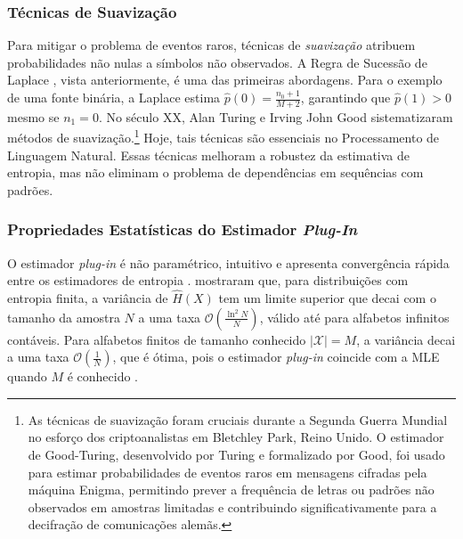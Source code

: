 \subsubsection{Técnicas de Suavização}

Para mitigar o problema de eventos raros, técnicas de \emph{suavização} atribuem
probabilidades não nulas a símbolos não observados. A Regra de Sucessão de
Laplace \parencite{laplace1840}, vista anteriormente, é uma das primeiras abordagens.
Para o exemplo de uma fonte binária, a Laplace estima
$\hat{p}(0) = \frac{n_0 + 1}{M + 2}$, garantindo que $\hat{p}(1) > 0$
mesmo se $n_1 = 0$. No século XX, Alan Turing e Irving John Good \parencite{good1953} 
sistematizaram métodos de suavização.\footnote[][-27ex]{As técnicas de suavização foram
cruciais durante a Segunda Guerra Mundial no esforço dos criptoanalistas em
Bletchley Park, Reino Unido. O estimador de Good-Turing, desenvolvido por
Turing e formalizado por Good, foi usado para estimar probabilidades de eventos
raros em mensagens cifradas pela máquina Enigma, permitindo prever a frequência
de letras ou padrões não observados em amostras limitadas e contribuindo
significativamente para a decifração de comunicações alemãs.} Hoje, tais técnicas
são essenciais no Processamento de Linguagem Natural. Essas técnicas
melhoram a robustez da estimativa de entropia, mas não eliminam o problema de
dependências em sequências com padrões.





\subsubsection{Propriedades Estatísticas do Estimador \textit{Plug-In}}

O estimador \textit{plug-in} é não paramétrico, intuitivo e apresenta
convergência rápida entre os estimadores de entropia \parencite{zhang2012b}. 
\textcite{antos2001} mostraram que, para distribuições com entropia
finita, a variância de $\hat{H}(X)$ tem um limite superior que decai com o
tamanho da amostra $N$ a uma taxa $\mathcal{O}\left(\frac{\ln^2 N}{N}\right)$, 
válido até para alfabetos infinitos contáveis. Para alfabetos
finitos de tamanho conhecido $|\mathcal{X}| = M$, a variância decai a uma
taxa $\mathcal{O}\left(\frac{1}{N}\right)$, que é ótima, pois o estimador
\textit{plug-in} coincide com a MLE quando $M$ é conhecido
\parencite{zhang2012b}.

